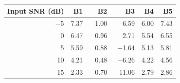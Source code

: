 \begin{tabular}{rrrrrr}
\toprule
Input SNR (dB) & B1 & B2 & B3 & B4 & B5 \\
\midrule
$-$5 & 7.37 & 1.00 & 6.59 & 6.00 & 7.43 \\
0 & 6.47 & 0.96 & 2.71 & 5.54 & 6.55 \\
5 & 5.59 & 0.88 & $-$1.64 & 5.13 & 5.81 \\
10 & 4.21 & 0.48 & $-$6.26 & 4.22 & 4.56 \\
15 & 2.33 & $-$0.70 & $-$11.06 & 2.79 & 2.86 \\
\bottomrule
\end{tabular}
